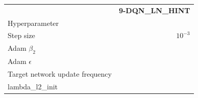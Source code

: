 \begin{tabular}{lr}
 & \bfseries 9-DQN_LN_HINT \\
Hyperparameter &  \\
Step size & $10^{-3}$ \\
Adam $\beta_2$ &  \\
Adam $\epsilon$ &  \\
Target network update frequency &  \\
lambda_l2_init &  \\
\end{tabular}
